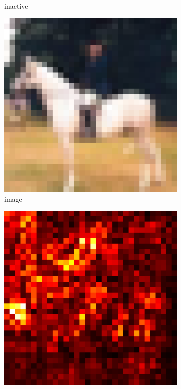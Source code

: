 \documentclass[preprint,12pt]{elsarticle}
\begin{document}
\begin{figure}
\begin{subfigure}{0.14\textwidth}
        \caption{inactive}
    \end{subfigure}
    \hfill
    \begin{subfigure}{0.14\linewidth}
        \centering
        \includegraphics[width=\linewidth]{../visualizations/examples/cifar10/resnet18/images/7.png}
        \caption{image}
    \end{subfigure}
    \hfill
    \begin{subfigure}{0.14\linewidth}
        \centering
        \includegraphics[width=\linewidth]{../visualizations/examples/cifar10/resnet18/saliency_map/7.png}

\end{subfigure}
\end{figure}
\end{document}
